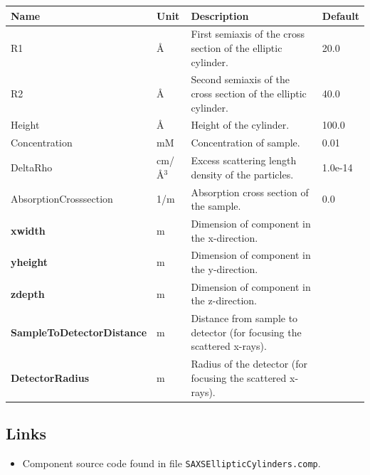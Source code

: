 \begin{longtable}{p{}p{}p{}p{}}
\toprule
\textbf{Name} & \textbf{Unit} & \textbf{Description} & \textbf{Default} \\
\midrule
\endhead
R1 & \AA{} & First semiaxis of the cross section of the elliptic cylinder. & 20.0 \\
R2 & \AA{} & Second semiaxis of the cross section of the elliptic cylinder. & 40.0 \\
Height & \AA{} & Height of the cylinder. & 100.0 \\
Concentration & mM & Concentration of sample. & 0.01 \\
DeltaRho & cm/\AA{}$^{3}$ & Excess scattering length density of the particles. & 1.0e-14 \\
AbsorptionCrosssection & 1/m & Absorption cross section of the sample. & 0.0 \\
\textbf{xwidth} & m & Dimension of component in the x-direction. &  \\
\textbf{yheight} & m & Dimension of component in the y-direction. &  \\
\textbf{zdepth} & m & Dimension of component in the z-direction. &  \\
\textbf{SampleToDetectorDistance} & m & Distance from sample to detector (for focusing the scattered x-rays). &  \\
\textbf{DetectorRadius} & m & Radius of the detector (for focusing the scattered x-rays). &  \\
\bottomrule
\end{longtable}

\subsection*{Links}
\begin{itemize}
  \item Component source code found in file \texttt{SAXSEllipticCylinders.comp}.
\end{itemize}
